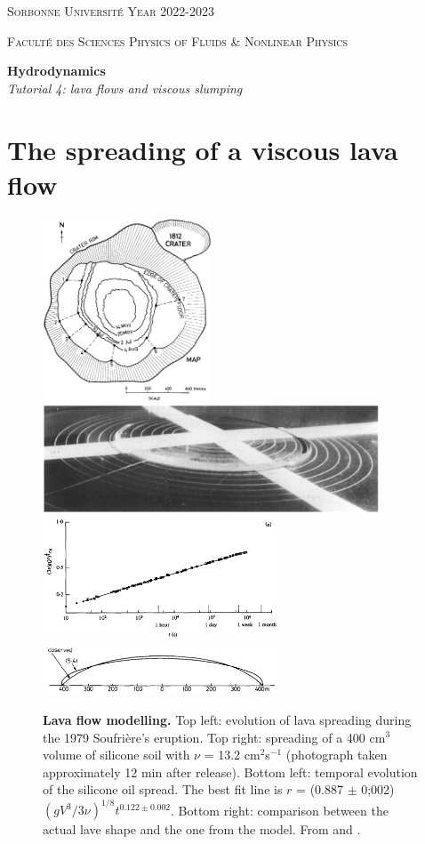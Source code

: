 \documentclass[11pt,a4paper]{article}
\begin{document}
\setlength{\unitlength}{1cm}
\noindent
\parbox{\textwidth}{
\textsc{
Sorbonne Université  
\hfill
Year 2022-2023
}
}
\parbox{\textwidth}{
\textsc{
Faculté des Sciences
\hfill
Physics of Fluids \& Nonlinear Physics
}
}

\begin{center}
\Large
\textbf{Hydrodynamics} \\ 
\textsl{Tutorial 4: lava flows and viscous slumping} \\[1ex]
\end{center}

\section{The spreading of a viscous lava flow \citep{Huppert1982}}
\begin{figure}[ht]
    \centering
    \includegraphics[width=5cm,valign=m]{soufriere.png}
    \includegraphics[width=10cm,valign=m]{silicon_oil.png}\\
    \includegraphics[width=7cm,valign=m]{spreading_law.png}
    \includegraphics[width=7cm,valign=m]{lava_flow_model.png}
    \caption{\textbf{Lava flow modelling.} Top left: evolution of lava spreading during the 1979 Soufrière's eruption. Top right: spreading of a 400 cm$^3$ volume of silicone soil with $\nu$ = 13.2 cm$^2$s$^{-1}$ (photograph taken approximately 12 min after release). Bottom left: temporal evolution of the silicone oil spread. The best fit line is $r$ = (0.887 $\pm$ 0;002)$(gV^3/3\nu)^{1/8}t^{0.122\pm0.002}$. Bottom right: comparison between the actual lave shape and the one from the model. From \citet{Huppert1982} and \citet{Huppert1982a}.}
    \label{fig:huppert}
\end{figure}
\end{document}
